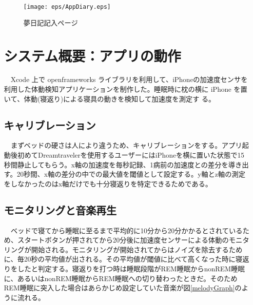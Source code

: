 \begin{figure}[htbp]
 \begin{minipage}{0.45\hsize}
  \begin{center}
   \texttt{[image: eps/AppDiary.eps]}
  \end{center}
  \caption{夢日記記入ページ}
  \label{le05}
 \end{minipage}
 \begin{minipage}{0.45\hsize}
 \end{minipage}
\end{figure}

\section{システム概要：アプリの動作}
　Xcode 上で openframeworks ライブラリを利用して、iPhoneの加速度センサを利用した体動検知アプリケーションを制作した。睡眠時に枕の横に iPhone を置いて、体動(寝返り)による寝具の動きを検知して加速度を測定す る。\\

\subsection{キャリブレーション}
　まずベッドの硬さは人により違うため、キャリブレーションをする。アプリ起動後初めてDreamtravelerを使用するユーザーにはiPhoneを横に置いた状態で15秒間静止してもらう。x軸の加速度を毎秒記録、1病前の加速度との差分を導き出す。20秒間、x軸の差分の中での最大値を閾値として設定する。y軸とz軸の測定をしなかったのはx軸だけでも十分寝返りを特定できるためである。\\

\subsection{モニタリングと音楽再生}
　ベッドで寝てから睡眠に至るまで平均的に10分から20分かかるとされているため、スタートボタンが押されてから20分後に加速度センサーによる体動のモニタリングが開始される。モニタリングが開始されてからはノイズを除去するために、毎20秒の平均値が出される。その平均値が閾値に比べて高くなった時に寝返りをしたと判定する。寝返りを打つ時は睡眠段階がREM睡眠からnonREM睡眠に、あるいはnonREM睡眠からREM睡眠への切り替わったときだ\cite{negaeri}。そのためREM睡眠に突入した場合はあらかじめ設定していた音楽が図\ref{melodyGraph}のように流れる。

